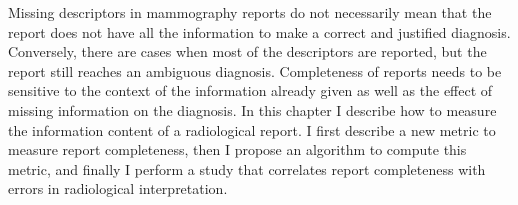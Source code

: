 Missing descriptors in mammography reports do not necessarily mean that the report does not have all the information to make a correct and justified diagnosis. Conversely, there are cases when most of the descriptors are reported, but the report still reaches an ambiguous diagnosis. Completeness of reports needs to be sensitive to the context of the information already given as well as the effect of missing information on the diagnosis. In this chapter I describe how to measure the information content of a radiological report. I first describe a new metric to measure report completeness, then I propose an algorithm to compute this metric, and finally I perform a study that correlates report completeness with errors in radiological interpretation.
